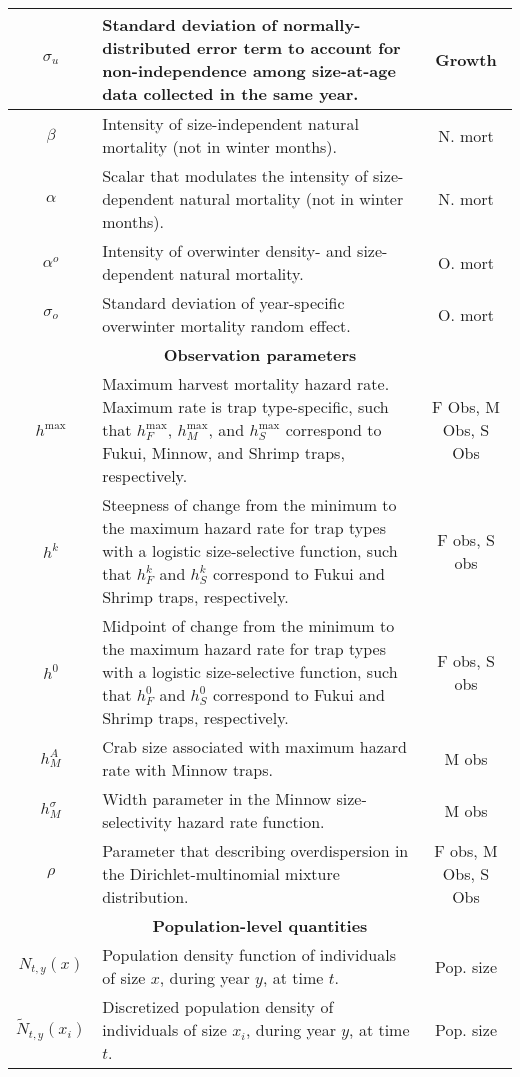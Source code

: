 \documentclass{article}
\begin{document}
\begin{table}[ht]
\begin{tabular}{||c p{9cm} c||}
 \hline
 $\sigma_u$ & Standard deviation of normally-distributed error term to account for non-independence among size-at-age data collected in the same year. & Growth \\ 
 \hline
 $\beta$ & Intensity of size-independent natural mortality (not in winter months). & N. mort \\ 
 \hline
 $\alpha$ & Scalar that modulates the intensity of size-dependent natural mortality (not in winter months). & N. mort \\ 
 \hline
 $\alpha^o$ & Intensity of overwinter density- and size-dependent natural mortality. & O. mort \\ 
 \hline
 $\sigma_o$ & Standard deviation of year-specific overwinter mortality random effect. & O. mort \\ 
 \hline\hline
 \multicolumn{3}{||c||}{\textbf{Observation parameters}} \\ 
 \hline
 $h^{\text{max}}$ & Maximum harvest mortality hazard rate. Maximum rate is trap type-specific, such that $h_F^{\text{max}}$, $h_M^{\text{max}}$, and $h_S^{\text{max}}$ correspond to Fukui, Minnow, and Shrimp traps, respectively. & F Obs, M Obs, S Obs \\ 
 \hline
 $h^{k}$ & Steepness of change from the minimum to the maximum hazard rate for trap types with a logistic size-selective function, such that $h_F^{k}$ and $h_S^{k}$ correspond to Fukui and Shrimp traps, respectively. & F obs, S obs \\ 
 \hline
 $h^{0}$ & Midpoint of change from the minimum to the maximum hazard rate for trap types with a logistic size-selective function, such that $h_F^{0}$ and $h_S^{0}$ correspond to Fukui and Shrimp traps, respectively. & F obs, S obs \\ 
 \hline
 $h_M^{A}$ & Crab size associated with maximum hazard rate with Minnow traps. & M obs \\ 
 \hline
 $h_M^{\sigma}$ & Width parameter in the Minnow size-selectivity hazard rate function. & M obs \\ 
 \hline
 $\rho$ & Parameter that describing overdispersion in the Dirichlet-multinomial mixture distribution. & F obs, M Obs, S Obs \\
 \hline\hline
 \multicolumn{3}{||c||}{\textbf{Population-level quantities}} \\ 
 \hline
 $N_{t,y}(x)$ & Population density function of individuals of size $x$, during year $y$, at time $t$. & Pop. size \\ 
 \hline 
 $\tilde{N}_{t,y}(x_i)$ & Discretized population density of individuals of size $x_i$, during year $y$, at time $t$. & Pop. size \\ 

\end{tabular}
\end{table}
\end{document}
